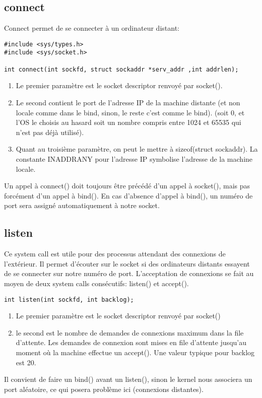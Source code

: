\documentclass[a4paper]{article}
\begin{document}
\subsection{connect}
Connect permet de se connecter à un ordinateur distant:
\begin{lstlisting}
#include <sys/types.h>
#include <sys/socket.h>

int connect(int sockfd, struct sockaddr *serv_addr ,int addrlen);
\end{lstlisting}
\begin{enumerate}
  \item Le premier paramètre est le socket descriptor renvoyé par
socket().
  \item Le second contient le port de l'adresse IP de la machine distante (et non locale comme dans le bind, sinon, le reste c'est comme le bind). (soit 0, et l'OS le choisis au hasard soit un nombre compris entre 1024 et 65535 qui n'est pas déjà utilisé).
  \item Quant au troisième paramètre, on peut le mettre à
sizeof(struct sockaddr). La constante INADDR\textunderscore{}ANY pour l'adresse IP symbolise l'adresse de la machine locale.
\end{enumerate}
Un appel à connect() doit toujours être précédé d'un appel à socket(), mais pas forcément d'un appel à bind(). En cas d'absence d'appel à bind(), un numéro de port sera assigné automatiquement à notre socket.
\subsection{listen}
Ce system call est utile pour des processus attendant des connexions de l'extérieur. Il permet d'écouter sur le socket si des ordinateurs distants essayent de se connecter sur notre numéro de port. L'acceptation de connexions se fait au moyen de deux system calls consécutifs: listen() et accept().
\begin{lstlisting}
int listen(int sockfd, int backlog);
\end{lstlisting}
\begin{enumerate}
  \item Le premier paramètre est le socket descriptor renvoyé par socket()
  \item le second est le nombre de demandes de connexions maximum dans la file d'attente. Les demandes de connexion sont mises en file d'attente jusqu'au moment où la machine effectue un accept(). Une valeur typique pour backlog est 20.
\end{enumerate}
Il convient de faire un bind() avant un listen(), sinon le kernel nous associera un port aléatoire, ce qui posera problème ici (connexions distantes).
\end{document}
